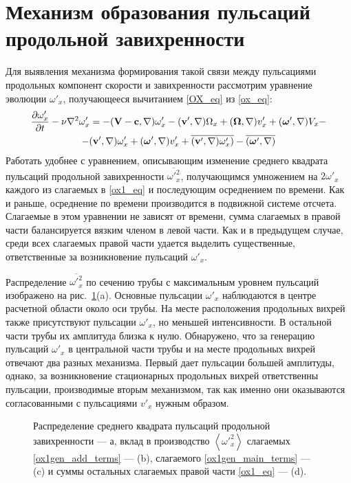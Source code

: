 \section{Механизм образования пульсаций продольной завихренности}

Для выявления механизма формирования такой связи между пульсациями продольных компонент скорости и завихренности рассмотрим уравнение эволюции $\omega'_x$, получающееся вычитанием \eqref{OX_eq} из \eqref{ox_eq}:
\begin{multline}\label{ox1_eq}
\frac{\partial \omega'_x}{\partial t} - \nu \nabla^2 \omega'_x = - (\mathbf{V} - \mathbf{c}, \nabla) \omega'_x - (\mathbf{v}', \nabla) \Omega_x
+(\mbox{\boldmath$\Omega$}, \nabla) v'_x + (\mbox{\boldmath$\omega$}', \nabla) V_x -\\- (\mathbf{v}', \nabla) \omega'_x  + (\mbox{\boldmath$\omega$}', \nabla) v'_x  + \overline{(\mathbf{v}', \nabla) \omega'_x)}  - \overline{(\mbox{\boldmath$\omega$}', \nabla)}
\end{multline}
Работать удобнее с уравнением, описывающим изменение среднего квадрата пульсаций продольной завихренности $\overline{\omega'^2_x}$, получающимся умножением на $2\omega'_x$ каждого из слагаемых в \eqref{ox1_eq} и последующим осреднением по времени. Как и раньше, осреднение по времени производится в подвижной системе отсчета. Слагаемые в этом уравнении не зависят от времени, сумма слагаемых в правой части балансируется вязким членом в левой части. Как и в предыдущем случае, среди всех слагаемых правой части удается выделить существенные, ответственные за возникновение пульсаций $\omega'_x$.


Распределение $\overline{\omega'^2_x}$ по сечению трубы с максимальным уровнем пульсаций изображено на рис.~\ref{ox1gen_pic}(a). Основные пульсации $\omega'_x$ наблюдаются в центре расчетной области около оси трубы. На месте расположения продольных вихрей также присутствуют пульсации $\omega'_x$, но меньшей интенсивности. В остальной части трубы их амплитуда близка к нулю. Обнаружено, что за генерацию пульсаций $\omega'_x$ в центральной части трубы и на месте продольных вихрей отвечают два разных механизма. Первый дает пульсации большей амплитуды, однако, за возникновение стационарных продольных вихрей ответственны пульсации, производимые вторым механизмом, так как именно они оказываются согласованными с пульсациями $v'_x$ нужным образом.


\begin{figure}[h]
\caption{Распределение среднего квадрата пульсаций продольной завихренности --- а, вклад в производство $\left<\omega'^2_x \right>$ слагаемых \eqref{ox1gen_add_terms} --- (b), слагаемого \eqref{ox1gen_main_terms} --- (c) и суммы остальных слагаемых правой части \eqref{ox1_eq} --- (d).}
\label{ox1gen_pic}
\end{figure}


